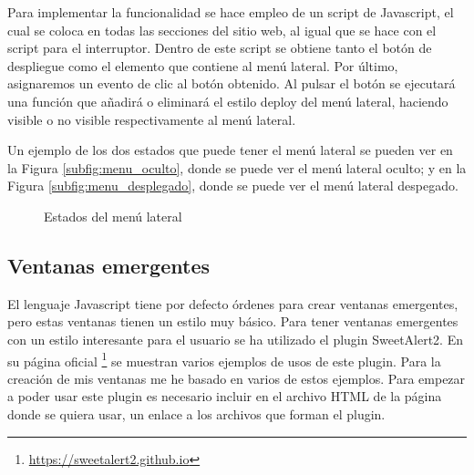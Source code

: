 Para implementar la funcionalidad se hace empleo de un script de Javascript, el cual se coloca en todas las secciones del sitio web, al igual que se hace con el script para el interruptor. Dentro de este script se obtiene tanto el botón de despliegue como el elemento que contiene al menú lateral. Por último, asignaremos un evento de clic al botón obtenido. Al pulsar el botón se ejecutará una función que añadirá o eliminará el estilo deploy del menú lateral, haciendo visible o no visible respectivamente al menú lateral.

Un ejemplo de los dos estados que puede tener el menú lateral se pueden ver en la Figura \ref{subfig:menu_oculto}, donde se puede ver el menú lateral oculto; y en la Figura \ref{subfig:menu_desplegado}, donde se puede ver el menú lateral despegado.

\begin{figure}[h]
\centering
{}
\caption{Estados del menú lateral}
\label{fig:estados_menu_lateral}
\end{figure}

\subsection{Ventanas emergentes}

El lenguaje Javascript tiene por defecto órdenes para crear ventanas emergentes, pero estas ventanas tienen un estilo muy básico. Para tener ventanas emergentes con un estilo interesante para el usuario se ha utilizado el plugin SweetAlert2. En su página oficial \footnote{\url{https://sweetalert2.github.io}} se muestran varios ejemplos de usos de este plugin. Para la creación de mis ventanas me he basado en varios de estos ejemplos. Para empezar a poder usar este plugin es necesario incluir en el archivo HTML de la página donde se quiera usar, un enlace a los archivos que forman el plugin.

